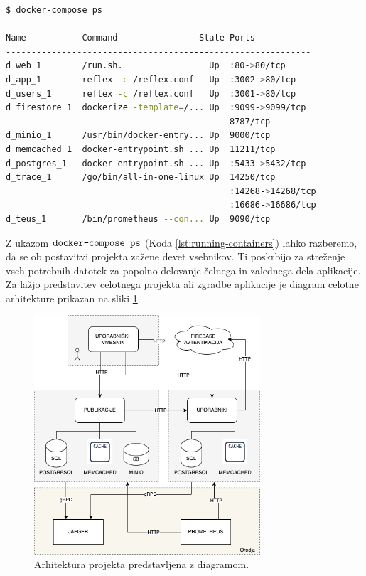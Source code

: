 \begin{lstlisting}[language=bash,style=mystyle,caption={Prikaz zagnanih vsebnikov.},label=lst:running-containers]
$ docker-compose ps

Name           Command                State Ports
------------------------------------------------------------
d_web_1        /run.sh.                 Up  :80->80/tcp
d_app_1        reflex -c /reflex.conf   Up  :3002->80/tcp
d_users_1      reflex -c /reflex.conf   Up  :3001->80/tcp
d_firestore_1  dockerize -template=/... Up  :9099->9099/tcp
                                            8787/tcp
d_minio_1      /usr/bin/docker-entry... Up  9000/tcp
d_memcached_1  docker-entrypoint.sh ... Up  11211/tcp
d_postgres_1   docker-entrypoint.sh ... Up  :5433->5432/tcp
d_trace_1      /go/bin/all-in-one-linux Up  14250/tcp
                                            :14268->14268/tcp
                                            :16686->16686/tcp
d_teus_1       /bin/prometheus --con... Up  9090/tcp
\end{lstlisting}


Z ukazom $\verb=docker-compose ps=$ (Koda \ref{lst:running-containers}) lahko razberemo, da se ob postavitvi projekta zažene devet vsebnikov. Ti poskrbijo za streženje vseh potrebnih datotek za popolno delovanje čelnega in zalednega dela aplikacije. Za lažjo predstavitev celotnega projekta ali zgradbe aplikacije je diagram celotne arhitekture prikazan na sliki \ref{final-arch}.

\begin{figure}[h]
\begin{center}
\includegraphics[width=0.75\textwidth]{slike/arch-done.png}
\end{center}
\caption{ Arhitektura projekta predstavljena z diagramom. }
\label{final-arch}
\end{figure}


